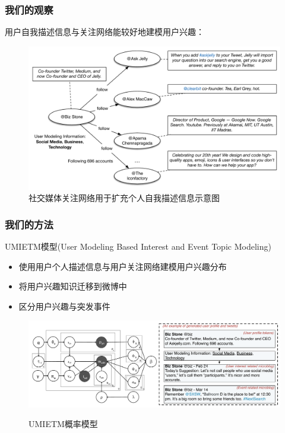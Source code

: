 \begin{frame}
\frametitle{\noindent 我们的观察}
用户自我描述信息与关注网络能较好地建模用户兴趣：
\begin{figure}[h]
		\setlength{\abovecaptionskip}{0.cm}
        \setlength{\belowcaptionskip}{0.cm}
        \centering
		\caption{社交媒体关注网络用于扩充个人自我描述信息示意图}
        \includegraphics[width=0.9\columnwidth]{img/UMIETM/UMIETM_profile.pdf}
\end{figure}
\end{frame}

\begin{frame}
\frametitle{\noindent 我们的方法}
UMIETM模型(User Modeling Based Interest and Event Topic Modeling)
\begin{itemize}
\item 使用用户个人描述信息与用户关注网络建模用户兴趣分布
\item 将用户兴趣知识迁移到微博中
\item 区分用户兴趣与突发事件
\end{itemize}

\vspace{-3mm}
\begin{figure}
	\setlength{\abovecaptionskip}{0.cm}
	\setlength{\belowcaptionskip}{0.cm}
	\caption{UMIETM概率模型}
	\includegraphics[width=1.0\textwidth]{img/UMIETM/model.pdf}
	\label{fig:modelUMIETM}
\end{figure}
\end{frame}

